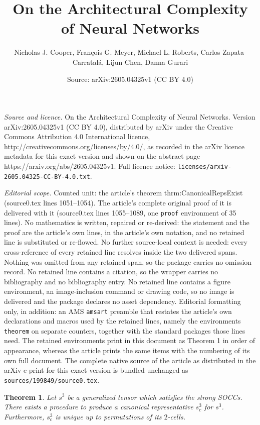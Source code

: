 \documentclass[10pt,a4paper]{amsart}
\title{On the Architectural Complexity of Neural Networks}
\author{Nicholas J. Cooper, Fran\c{c}ois G. Meyer, Michael L. Roberts, Carlos Zapata-Carratal\'a, Lijun Chen, Danna Gurari}
\date{Source: arXiv:2605.04325v1 (CC BY 4.0)}
\newtheorem{theorem}{Theorem}
\begin{document}
\maketitle

\noindent\emph{Source and licence.} On the Architectural Complexity of Neural Networks. Version arXiv:2605.04325v1 (CC BY 4.0), distributed by arXiv under the Creative Commons Attribution 4.0 International licence, http://creativecommons.org/licenses/by/4.0/, as recorded in the arXiv licence metadata for this exact version and shown on the abstract page https://arxiv.org/abs/2605.04325v1. Full licence notice: \texttt{licenses/arxiv-2605.04325-CC-BY-4.0.txt}.\par\smallskip

\noindent\textit{Editorial scope.} Counted unit: the article's theorem thrm:CanonicalRepsExist (source0.tex lines 1051--1054). The article's complete original proof of it is delivered with it (source0.tex lines 1055--1089, one \texttt{proof} environment of 35 lines). No mathematics is written, repaired or re-derived: the statement and the proof are the article's own lines, in the article's own notation, and no retained line is substituted or re-flowed.  No further source-local context is needed: every cross-reference of every retained line resolves inside the two delivered spans.  Nothing was omitted from any retained span, so the package carries no omission record.  No retained line contains a citation, so the wrapper carries no bibliography and no bibliography entry.  No retained line contains a figure environment, an image-inclusion command or drawing code, so no image is delivered and the package declares no asset dependency.  Editorial formatting only, in addition: an AMS \texttt{amsart} preamble that restates the article's own declarations and macros used by the retained lines, namely the environments \texttt{theorem} on separate counters, together with the standard packages those lines need.  The retained environments print in this document as Theorem 1 in order of appearance, whereas the article prints the same items with the numbering of its own full document.  The complete native source of the article as distributed in the arXiv e-print for this exact version is bundled unchanged as \texttt{sources/199849/source0.tex}.
\begin{theorem}
	Let $s^3$ be a generalized tensor which satisfies the strong SOCCs. There exists a procedure to produce a canonical representative $s^3_c$ for $s^3$. Furthermore, $s^3_c$ is unique up to permutations of its $2$-cells.
	\label{thrm:CanonicalRepsExist}
\end{theorem}
\end{document}
